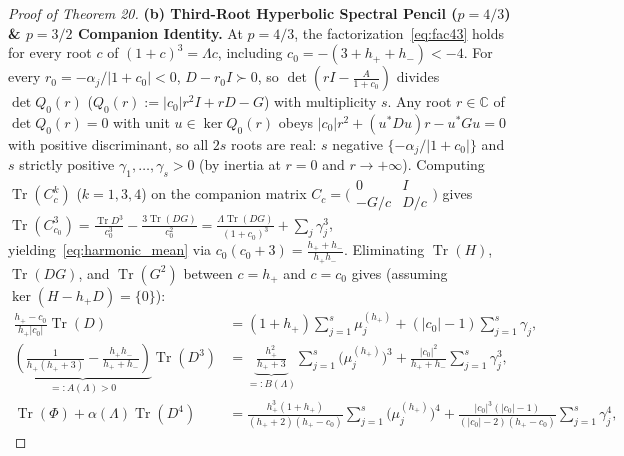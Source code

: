 \documentclass[10pt,letterpaper]{article}
\newcommand{\C}{\mathbb{C}}
\newcommand{\Tr}{\operatorname{Tr}}
\begin{document}
\begin{proof}[Proof of Theorem 20]
\textbf{(b) Third-Root Hyperbolic Spectral Pencil ($p = 4/3$) \& $p = 3/2$ Companion Identity.}
At $p = 4/3$, the factorization~\eqref{eq:fac43} holds for every root $c$ of $(1+c)^3 = \Lambda c$, including $c_0 = -(3+h_++h_-) < -4$. For every $r_0 = -\alpha_j/|1+c_0| < 0$, $D - r_0 I \succ 0$, so $\det(rI - \frac{A}{1+c_0})$ divides $\det Q_0(r)$ ($Q_0(r) := |c_0|r^2 I + rD - G$) with multiplicity $s$. Any root $r \in \C$ of $\det Q_0(r) = 0$ with unit $u \in \ker Q_0(r)$ obeys $|c_0|r^2 + (u^* D u)r - u^* G u = 0$ with positive discriminant, so all $2s$ roots are real: $s$ negative $\{-\alpha_j/|1+c_0|\}$ and $s$ strictly positive $\gamma_1,\dots,\gamma_s > 0$ (by inertia at $r = 0$ and $r \to +\infty$). Computing $\Tr(C_c^k)$ ($k = 1, 3, 4$) on the companion matrix $C_c = \bigl(\begin{smallmatrix} 0 & I \\ -G/c & D/c \end{smallmatrix}\bigr)$ gives $\Tr(C_{c_0}^3) = \frac{\Tr D^3}{c_0^3} - \frac{3\Tr(DG)}{c_0^2} = \frac{\Lambda\Tr(DG)}{(1+c_0)^3} + \sum_j \gamma_j^3$, yielding~\eqref{eq:harmonic_mean} via $c_0(c_0+3) = \frac{h_+ + h_-}{h_+ h_-}$. Eliminating $\Tr(H)$, $\Tr(DG)$, and $\Tr(G^2)$ between $c = h_+$ and $c = c_0$ gives (assuming $\ker(H - h_+ D) = \{0\}$):
\begin{align*}
  \frac{h_+ - c_0}{h_+ |c_0|}\Tr(D) &= (1+h_+)\sum_{j=1}^s \mu_j^{(h_+)} + (|c_0|-1)\sum_{j=1}^s \gamma_j, \\
  \underbrace{\left(\frac{1}{h_+(h_++3)} - \frac{h_+ h_-}{h_+ + h_-}\right)}_{=: A(\Lambda) > 0}\Tr(D^3) &= \underbrace{\frac{h_+^2}{h_+ + 3}}_{=: B(\Lambda)}\sum_{j=1}^s \bigl(\mu_j^{(h_+)}\bigr)^3 + \frac{|c_0|^2}{h_+ + h_-}\sum_{j=1}^s \gamma_j^3, \\
  \Tr(\Phi) + \alpha(\Lambda)\Tr(D^4) &= \frac{h_+^3(1+h_+)}{(h_++2)(h_+-c_0)}\sum_{j=1}^s \bigl(\mu_j^{(h_+)}\bigr)^4 + \frac{|c_0|^3(|c_0|-1)}{(|c_0|-2)(h_+-c_0)}\sum_{j=1}^s \gamma_j^4,
\end{align*}

\end{proof}
\end{document}
